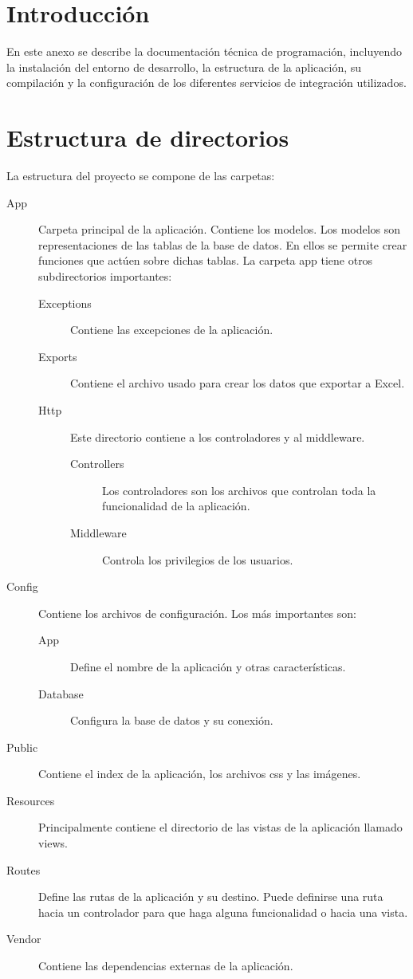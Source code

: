 
\section{Introducción}
En este anexo se describe la documentación técnica de programación, incluyendo la instalación del entorno de desarrollo, la estructura de la aplicación, su compilación y la configuración de los diferentes servicios de integración utilizados.
\section{Estructura de directorios}
La estructura del proyecto se compone de las carpetas:
\begin{description}
    \item [App] Carpeta principal de la aplicación. Contiene los modelos. Los modelos son representaciones de las tablas de la base de datos. En ellos se permite crear funciones que actúen sobre dichas tablas. La carpeta app tiene otros subdirectorios importantes:
    \begin{description}
        \item [Exceptions] Contiene las excepciones de la aplicación.
        \item [Exports] Contiene el archivo usado para crear los datos que exportar a Excel.
        \item [Http] Este directorio contiene a los controladores y al middleware.
        \begin{description}
            \item [Controllers] Los controladores son los archivos que controlan toda la funcionalidad de la aplicación.
            \item[Middleware] Controla los privilegios de los usuarios.
        \end{description}
    \end{description}
    \item[Config] Contiene los archivos de configuración. Los más importantes son:
    \begin{description}
        \item [App] Define el nombre de la aplicación y otras características.
        \item[Database] Configura la base de datos y su conexión.
    \end{description}
    \item[Public] Contiene el index de la aplicación, los archivos css y las imágenes.
    \item[Resources] Principalmente contiene el directorio de las vistas de la aplicación llamado views.
    \item[Routes] Define las rutas de la aplicación y su destino. Puede definirse una ruta hacia un controlador para que haga alguna funcionalidad o hacia una vista.
    \item[Vendor] Contiene las dependencias externas de la aplicación.
\end{description}
